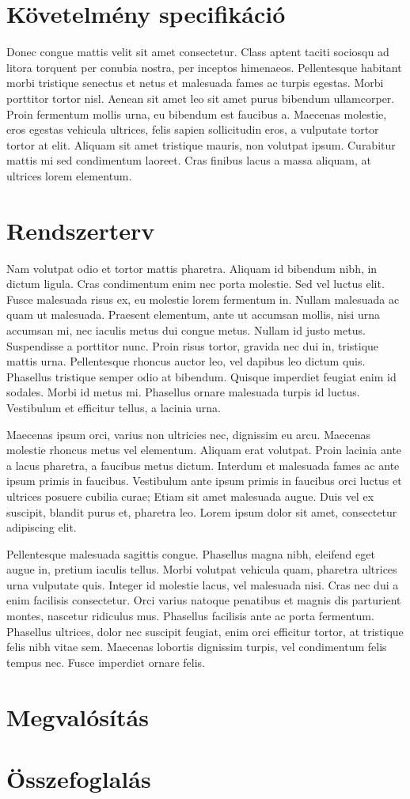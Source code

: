 \documentclass[a4paper,12pt,oneside]{report}
\begin{document}
\chapter{Követelmény specifikáció}

Donec congue mattis velit sit amet consectetur. Class aptent taciti sociosqu ad
litora torquent per conubia nostra, per inceptos himenaeos. Pellentesque
habitant morbi tristique senectus et netus et malesuada fames ac turpis
egestas. Morbi porttitor tortor nisl. Aenean sit amet leo sit amet purus
bibendum ullamcorper. Proin fermentum mollis urna, eu bibendum est faucibus a.
Maecenas molestie, eros egestas vehicula ultrices, felis sapien sollicitudin
eros, a vulputate tortor tortor at elit. Aliquam sit amet tristique mauris, non
volutpat ipsum. Curabitur mattis mi sed condimentum laoreet. Cras finibus lacus
a massa aliquam, at ultrices lorem elementum.


\chapter{Rendszerterv}

Nam volutpat odio et tortor mattis pharetra. Aliquam id bibendum nibh, in
dictum ligula. Cras condimentum enim nec porta molestie. Sed vel luctus elit.
Fusce malesuada risus ex, eu molestie lorem fermentum in. Nullam malesuada ac
quam ut malesuada. Praesent elementum, ante ut accumsan mollis, nisi urna
accumsan mi, nec iaculis metus dui congue metus. Nullam id justo metus.
Suspendisse a porttitor nunc. Proin risus tortor, gravida nec dui in, tristique
mattis urna. Pellentesque rhoncus auctor leo, vel dapibus leo dictum quis.
Phasellus tristique semper odio at bibendum. Quisque imperdiet feugiat enim id
sodales. Morbi id metus mi. Phasellus ornare malesuada turpis id luctus.
Vestibulum et efficitur tellus, a lacinia urna.

Maecenas ipsum orci, varius non ultricies nec, dignissim eu arcu. Maecenas
molestie rhoncus metus vel elementum. Aliquam erat volutpat. Proin lacinia ante
a lacus pharetra, a faucibus metus dictum. Interdum et malesuada fames ac ante
ipsum primis in faucibus. Vestibulum ante ipsum primis in faucibus orci luctus
et ultrices posuere cubilia curae; Etiam sit amet malesuada augue. Duis vel ex
suscipit, blandit purus et, pharetra leo. Lorem ipsum dolor sit amet,
consectetur adipiscing elit.

Pellentesque malesuada sagittis congue. Phasellus magna nibh, eleifend eget
augue in, pretium iaculis tellus. Morbi volutpat vehicula quam, pharetra
ultrices urna vulputate quis. Integer id molestie lacus, vel malesuada nisi.
Cras nec dui a enim facilisis consectetur. Orci varius natoque penatibus et
magnis dis parturient montes, nascetur ridiculus mus. Phasellus facilisis ante
ac porta fermentum. Phasellus ultrices, dolor nec suscipit feugiat, enim orci
efficitur tortor, at tristique felis nibh vitae sem. Maecenas lobortis
dignissim turpis, vel condimentum felis tempus nec. Fusce imperdiet ornare
felis.

\chapter{Megvalósítás}


\chapter{Összefoglalás}
\end{document}
